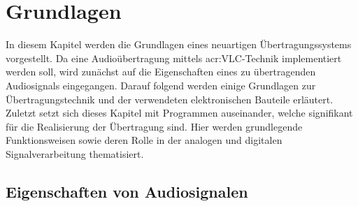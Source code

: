 \chapter{Grundlagen}
\label{chap:fundamentals_related-work}
In diesem Kapitel werden die Grundlagen eines neuartigen Übertragungssystems vorgestellt. Da eine Audioübertragung mittels \gls{acr:VLC}-Technik implementiert werden soll, wird zunächst auf die Eigenschaften eines zu übertragenden Audiosignals eingegangen. Darauf folgend werden einige Grundlagen zur Übertragungstechnik und der verwendeten elektronischen Bauteile erläutert. Zuletzt setzt sich dieses Kapitel mit Programmen auseinander, welche signifikant für die Realisierung der Übertragung sind. Hier werden grundlegende Funktionsweisen sowie deren Rolle in der analogen und digitalen Signalverarbeitung thematisiert. 

\section{Eigenschaften von Audiosignalen}
\label{subsec:audio}

